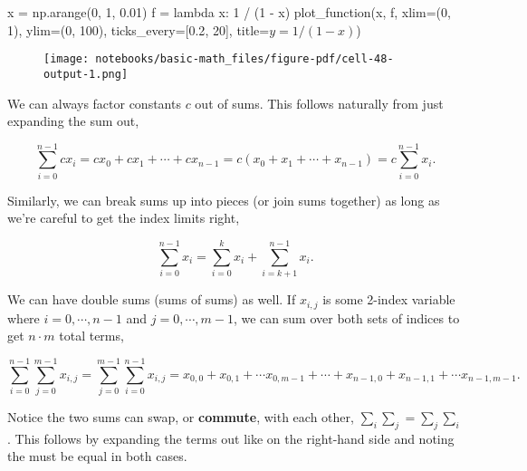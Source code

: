 \documentclass[
  letterpaper,
  DIV=11,
  numbers=noendperiod]{scrreprt}
\newenvironment{Shaded}{\begin{snugshade}}{\end{snugshade}}
\newcommand{\DecValTok}[1]{\textcolor[rgb]{0.68,0.00,0.00}{#1}}
\newcommand{\FloatTok}[1]{\textcolor[rgb]{0.68,0.00,0.00}{#1}}
\newcommand{\KeywordTok}[1]{\textcolor[rgb]{0.00,0.23,0.31}{#1}}
\newcommand{\NormalTok}[1]{\textcolor[rgb]{0.00,0.23,0.31}{#1}}
\newcommand{\OperatorTok}[1]{\textcolor[rgb]{0.37,0.37,0.37}{#1}}
\newcommand{\StringTok}[1]{\textcolor[rgb]{0.13,0.47,0.30}{#1}}
\begin{document}
\begin{Shaded}
\begin{Highlighting}[]
\NormalTok{x }\OperatorTok{=}\NormalTok{ np.arange(}\DecValTok{0}\NormalTok{, }\DecValTok{1}\NormalTok{, }\FloatTok{0.01}\NormalTok{)}
\NormalTok{f }\OperatorTok{=} \KeywordTok{lambda}\NormalTok{ x: }\DecValTok{1} \OperatorTok{/}\NormalTok{ (}\DecValTok{1} \OperatorTok{{-}}\NormalTok{ x)}
\NormalTok{plot\_function(x, f, xlim}\OperatorTok{=}\NormalTok{(}\DecValTok{0}\NormalTok{, }\DecValTok{1}\NormalTok{), ylim}\OperatorTok{=}\NormalTok{(}\DecValTok{0}\NormalTok{, }\DecValTok{100}\NormalTok{), ticks\_every}\OperatorTok{=}\NormalTok{[}\FloatTok{0.2}\NormalTok{, }\DecValTok{20}\NormalTok{], }
\NormalTok{              title}\OperatorTok{=}\StringTok{\textquotesingle{}$y=1/(1{-}x)$\textquotesingle{}}\NormalTok{)}
\end{Highlighting}
\end{Shaded}

\begin{figure}[H]

{\centering \texttt{[image: notebooks/basic-math\_files/figure-pdf/cell-48-output-1.png]}

}

\end{figure}

We can always factor constants \(c\) out of sums. This follows naturally
from just expanding the sum out,

\[\sum_{i=0}^{n-1} c x_i = cx_0 + cx_1 + \cdots + cx_{n-1} = c(x_0 + x_1 + \cdots + x_{n-1}) = c\sum_{i=0}^{n-1} x_i.\]

Similarly, we can break sums up into pieces (or join sums together) as
long as we're careful to get the index limits right,

\[\sum_{i=0}^{n-1} x_i = \sum_{i=0}^{k} x_i + \sum_{i=k+1}^{n-1} x_i.\]

We can have double sums (sums of sums) as well. If \(x_{i,j}\) is some
2-index variable where \(i=0,\cdots,n-1\) and \(j=0,\cdots,m-1\), we can
sum over both sets of indices to get \(n \cdot m\) total terms,

\[\sum_{i=0}^{n-1} \sum_{j=0}^{m-1} x_{i,j} = \sum_{j=0}^{m-1} \sum_{i=0}^{n-1} x_{i,j} = x_{0,0} + x_{0,1} + \cdots x_{0,m-1} + \cdots + x_{n-1,0} + x_{n-1,1} + \cdots x_{n-1,m-1}.\]

Notice the two sums can swap, or \textbf{commute}, with each other,
\(\sum_i \sum_j = \sum_j \sum_i\). This follows by expanding the terms
out like on the right-hand side and noting the must be equal in both
cases.
\end{document}
